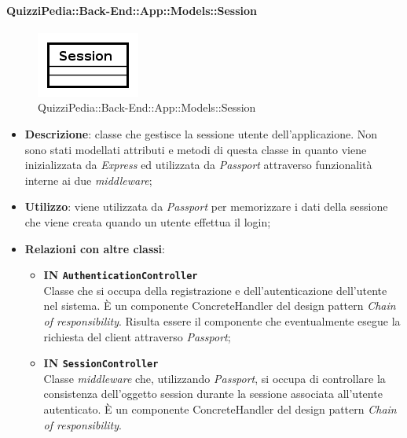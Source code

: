 \paragraph{QuizziPedia::Back-End::App::Models::Session}
\label{QuizziPedia::Back-End::App::Models::Session}
\begin{figure}[ht]
	\centering
	\includegraphics[scale=0.8]{UML/Classi/Back-End/QuizziPedia_Back-End_App_Models_sessionModel.png}
	\caption{QuizziPedia::Back-End::App::Models::Session}
\end{figure}
\FloatBarrier
	\begin{itemize}
		\item \textbf{Descrizione}: classe che gestisce la sessione utente dell'applicazione. Non sono stati modellati attributi e metodi di questa classe in quanto viene inizializzata da \textit{Express} ed utilizzata da \textit{Passport} attraverso funzionalità interne ai due \textit{middleware};
		\item \textbf{Utilizzo}: viene utilizzata da \textit{Passport} per memorizzare i dati della sessione che viene creata quando un utente effettua il login;
		\item \textbf{Relazioni con altre classi}:
			\begin{itemize}
				\item
				\textbf{IN \texttt{AuthenticationController}} \\
				Classe che si occupa della registrazione e dell'autenticazione dell'utente nel sistema. È un componente ConcreteHandler del design pattern \textit{Chain of responsibility}. Risulta essere il componente che eventualmente esegue la richiesta del client attraverso \textit{Passport};			
				\item
				\textbf{IN \texttt{SessionController}} \\
				Classe \textit{middleware} che, utilizzando \textit{Passport}, si occupa di controllare la consistenza dell'oggetto session durante la sessione associata all'utente autenticato. È un componente ConcreteHandler del design pattern \textit{Chain of responsibility}.
			\end{itemize}
	\end{itemize}